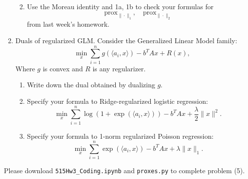 \documentclass[11pt]{amsart}
\begin{document}
\begin{enumerate}
\begin{enumerate}
\bigskip \bigskip

\item Use the Moreau identity and 1a, 1b to check your formulas for 
\[
\mbox{prox}_{\|\cdot\|_1}, \quad \mbox{prox}_{\|\cdot\|_2}
\]
from last week's homework. 
\end{enumerate}

\newpage



%
%
%
%
%
%
%

\item Duals of regularized GLM. Consider the Generalized Linear Model family: 
\[
\min_{x} \sum_{i=1}^n g(\langle a_i, x\rangle) - b^TAx + R(x),
\]
Where $g$ is convex and $R$ is any regularizer. 
\begin{enumerate}
\item Write down the dual obtained by dualizing $g$.
\bigskip\bigskip
\item Specify your formula to Ridge-regularized logistic regression: 
\[
\min_x \sum_{i=1}^n \log(1+\exp(\langle a_i, x \rangle))  - b^TAx  + \frac{\lambda}{2}\|x\|^2. 
\]
\bigskip\bigskip
\item Specify your formula to 1-norm regularized Poisson regression: 
\[
\min_x \sum_{i=1}^n \exp(\langle a_i, x \rangle) - b^TAx +  \lambda\|x\|_1. 
\]
\end{enumerate}
\bigskip \bigskip
\end{enumerate}
\vskip 8pt
Please download \texttt{515Hw3\_Coding.ipynb} and \texttt{proxes.py} to complete problem (5).
\end{document}
